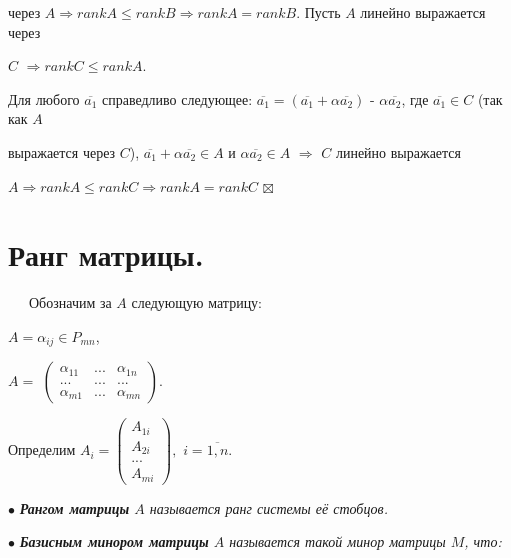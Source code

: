 \documentclass[a4paper, 12pt]{report}
\begin{document}
	\quad через $A \Rightarrow rankA \leqslant rankB \Rightarrow rankA = rankB$. Пусть $A$ линейно выражается через 
	
	\quad$C$ $\Rightarrow rankC \leqslant rankA$.
	
	\quad Для любого $\overline{a_{1}}$ справедливо следующее: $\overline{a_{1}} = (\overline{a_{1}} + \alpha \overline{a_{2}})$ - $\alpha \overline{a_{2}}$, где $\overline{a_{1}} \in C$ (так как $A$ 
	
	 выражается через $C$), $\overline{a_{1}} + \alpha \overline{a_{2}} \in A$ и $\alpha \overline{a_{2}} \in A$ $\Rightarrow$ $C$ линейно выражается 
	
	 $A \Rightarrow rankA \leqslant rankC \Rightarrow rankA = rankC$ $\boxtimes$
	
	
	
	
	
	
	
	
	
	
	
	
	
	
	
	
	
	
	
	\section{Ранг матрицы.}
	\par\bigskip
	$\quad \; \ $Обозначим за $A$ следующую матрицу:
	
	$A=\alpha_{ij} \in P_{mn}$,
	\par\bigskip
	$A=$ $\begin{pmatrix} 
		\alpha_{11} & ... & \alpha_{1n} 
		\\ ... & ... & ...
		\\ \alpha_{m1} & ... & \alpha_{mn}
	\end{pmatrix}$.
	\par\bigskip
	Определим $A_{i}=\begin{pmatrix} 
		A_{1i} 
		\\A_{2i}
		\\...
		\\A_{mi}
	\end{pmatrix},$ $i=\overline{1,n}$.
	\par\bigskip
	$\bullet$ \textit{\textbf{Рангом матрицы} $A$ называется ранг системы её стобцов.}
	\par\bigskip
	$\bullet$ \textit{\textbf{Базисным минором матрицы} $A$ называется такой минор матрицы $M$, что: }
	
\end{document}
